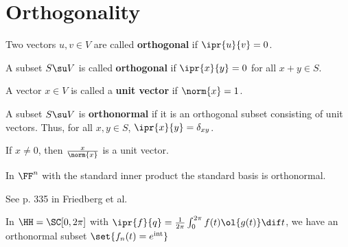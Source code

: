 \documentclass[11pt]{scrartcl}
\begin{document}
\section{Orthogonality}
\begin{definition}
  Two vectors $u, v \in V$ are called \textbf{orthogonal} if $\ipr{u}{v} = 0$.
\end{definition}

\begin{definition}
A subset $S\su V$ is called \textbf{orthogonal} if $\ipr{x}{y} = 0$ for all $x+y \in S$.
\end{definition}

\begin{definition}
A vector $x\in V$ is called a \textbf{unit vector} if $\norm{x} = 1$.
\end{definition}

\begin{definition}
  A subset $S\su V$ is \textbf{orthonormal} if it is an orthogonal
  subset consisting of unit vectors. Thus, for all $x, y \in S$,
  $\ipr{x}{y} = \delta_{xy}$.
\end{definition}

\begin{remark}
If $x\neq 0$, then $\frac{x}{\norm{x}}$ is a unit vector.
\end{remark}

\begin{example}

In $\FF^n$ with the standard inner product the standard basis is orthonormal.

\end{example}

\begin{example}
  See p. 335 in Friedberg et al.

  In $\HH = \SC[0,2\pi]$ with
  $\ipr{f}{q} = \frac{1}{2\pi}\int_0^{2\pi}f(t)\ol{g(t)}\dif t$,
  we have an orthonormal subset $\set{f_n(t) = e^{\text{int}}}$

\end{example}
\end{document}
